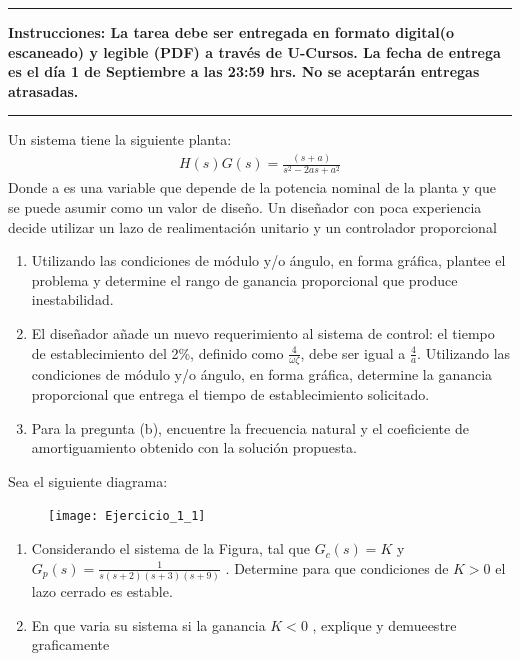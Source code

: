 \documentclass[
  11pt,
  letterpaper,
   addpoints,
  ]{exam}
\begin{document}
\vspace{0.5cm}
\noindent
\vspace{.85cm}
\hrule
\textbf{Instrucciones: La tarea debe ser entregada en formato digital(o escaneado) y legible (PDF) a través de U-Cursos. La fecha de entrega es el día 1 de Septiembre a las 23:59 hrs. No se aceptarán entregas atrasadas.}
\hrule
\begin{questions}
    \question Un sistema tiene la siguiente planta:
    \begin{align*}
        H(s)G(s) = \frac{(s+a)}{s^{2}-2as+a^{2}}
    \end{align*}
    Donde a es una variable que depende de la potencia nominal de la planta y que se puede asumir como un valor de diseño. Un diseñador con poca experiencia decide utilizar un lazo de realimentación unitario y un controlador proporcional
    \begin{enumerate}
        \item Utilizando las condiciones de módulo y/o ángulo, en forma gráfica, plantee el problema y determine el rango de ganancia proporcional que produce inestabilidad.
        \item El diseñador añade un nuevo requerimiento al sistema de control: el tiempo de establecimiento del 2\%, definido como \(\frac{4}{\omega \zeta}\), debe ser igual a \(\frac{4}{a}\). Utilizando las condiciones de módulo y/o ángulo, en forma gráfica, determine la ganancia proporcional que entrega el tiempo de establecimiento solicitado.
        \item Para la pregunta (b), encuentre la frecuencia natural y el coeficiente de amortiguamiento obtenido con la solución propuesta.
    \end{enumerate}
    
   
    \question Sea el siguiente diagrama:
    \begin{figure}[h]
        \centering
        \texttt{[image: Ejercicio\_1\_1]}
    \end{figure}
    \begin{enumerate}
        \item Considerando el sistema de la Figura, tal que $G_{c}(s) = K$ y $G_{p}(s) = \frac{1}{s(s+2)(s+3)(s+9)}$ . Determine para que condiciones de $K>0$ el lazo cerrado es estable.
        \item En que varia su sistema si la ganancia $K<0$ , explique y demueestre graficamente
    \end{enumerate}
\end{questions}
\newpage
\end{document}
